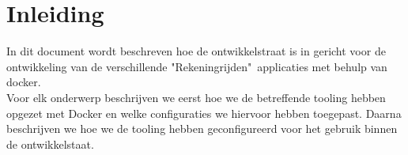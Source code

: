 \chapter{Inleiding}
In dit document wordt beschreven hoe de ontwikkelstraat is in gericht voor de ontwikkeling van de verschillende "Rekeningrijden"\ applicaties met behulp van docker.
\\
Voor elk onderwerp beschrijven we eerst hoe we de betreffende tooling hebben opgezet met Docker en welke configuraties we hiervoor hebben toegepast. Daarna beschrijven we hoe we de tooling hebben geconfigureerd voor het gebruik binnen de ontwikkelstaat.
